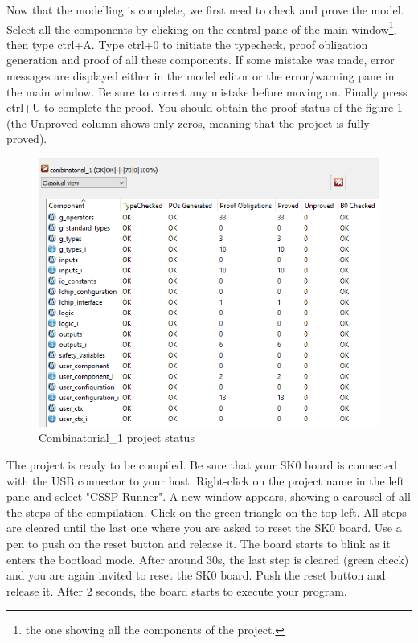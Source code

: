 Now that the modelling is complete, we first need to check and prove the model. Select all the components by clicking on the central pane of the main window\footnote{the one showing all the components of the project.}, then type ctrl+A. Type ctrl+0 to initiate the typecheck, proof obligation generation and proof of all these components. If some mistake was made, error messages are displayed either in the model editor or the error/warning pane in the main window. Be sure to correct any mistake before moving on. Finally press ctrl+U to complete the proof. You should obtain the proof status of the figure \ref{projects:Combinatorial_1-project-status} (the Unproved column shows only zeros, meaning that the project is fully proved).
\begin{figure}[h]
\centering\includegraphics[scale=0.5]{Pictures/chaptProjects/comb1-project-status.png}
\caption{Combinatorial\_1 project status}
\label{projects:Combinatorial_1-project-status}
\end{figure}
The project is ready to be compiled. Be sure that your SK0 board is connected with the USB connector to your host. Right-click on the project name in the left pane and select "CSSP Runner". A new window appears, showing a carousel of all the steps of the compilation. Click on the green triangle on the top left. All steps are cleared until the last one where you are asked to reset the SK0 board. Use a pen to push on the reset button and release it. The board starts to blink as it enters the bootload mode. After around 30s, the last step is cleared (green check) and you are again invited to reset the SK0 board. Push the reset button and release it. After 2 seconds, the board starts to execute your program.

